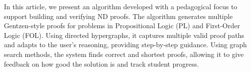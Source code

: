 
In this article, we present an algorithm developed with a pedagogical focus to support building and verifying ND proofs. The algorithm generates multiple Gentzen-style proofs for problems in Propositional Logic (PL) and First-Order Logic (FOL). Using directed hypergraphs, it captures multiple valid proof paths and adapts to the user’s reasoning, providing step-by-step guidance. Using graph search methods, the system finds correct and shortest proofs, allowing it to give feedback on how good the solution is and track student progress.
